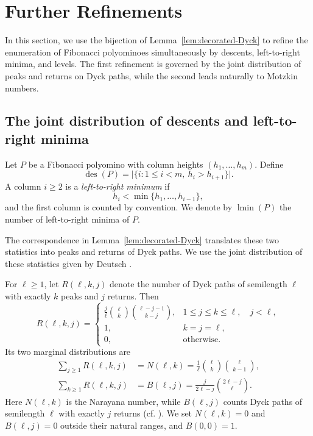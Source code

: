 \documentclass[12pt]{amsart}
\theoremstyle{plain}
\theoremstyle{definition}
\DeclareMathOperator{\des}{des}
\DeclareMathOperator{\lmin}{lmin}
\begin{document}
\section{Further Refinements}\label{sec:further-refinements}


In this section, we use the bijection of
Lemma~\ref{lem:decorated-Dyck} to refine the enumeration of Fibonacci
polyominoes simultaneously by descents, left-to-right minima, and
levels. The first refinement is governed by the joint distribution of
peaks and returns on Dyck paths, while the second leads naturally to
Motzkin numbers.


\subsection{The joint distribution of descents and left-to-right minima}
\label{subsec:descents-minima}


Let $P$ be a Fibonacci polyomino with column heights
$(h_1,\ldots,h_m)$. Define
\[
\des(P)
=
\bigl|\{i:1\leq i<m,\ h_i>h_{i+1}\}\bigr|.
\]
A column $i\geq2$ is a \emph{left-to-right minimum} if
\[
h_i<\min\{h_1,\ldots,h_{i-1}\},
\]
and the first column is counted by convention. We denote by $\lmin(P)$
the number of left-to-right minima of $P$.

The correspondence in Lemma~\ref{lem:decorated-Dyck} translates these
two statistics into peaks and returns of Dyck paths. We use the joint
distribution of these statistics given by Deutsch
\cite[Section~6.5, Eq.~(6.20)]{DeutschDyck}.

For $\ell\geq1$, let $R(\ell,k,j)$ denote the number of Dyck paths of
semilength $\ell$ with exactly $k$ peaks and $j$ returns. Then
\[
R(\ell,k,j)
=
\begin{cases}
\displaystyle
\frac{j}{\ell}
\binom{\ell}{k}
\binom{\ell-j-1}{k-j},
& 1\leq j\leq k\leq\ell,\quad j<\ell,\\[3mm]
1,
& k=j=\ell,\\
0,
& \text{otherwise}.
\end{cases}
\]
Its two marginal distributions are
\begin{align*}
\sum_{j\geq1}R(\ell,k,j)
&=
N(\ell,k)
=
\frac{1}{\ell}
\binom{\ell}{k}
\binom{\ell}{k-1},\\
\sum_{k\geq1}R(\ell,k,j)
&=
B(\ell,j)
=
\frac{j}{2\ell-j}
\binom{2\ell-j}{\ell}.
\end{align*}
Here $N(\ell,k)$ is the Narayana number, while $B(\ell,j)$ counts Dyck
paths of semilength $\ell$ with exactly $j$ returns (cf. \cite{Deutsch98}). We set
$N(\ell,k)=0$ and $B(\ell,j)=0$ outside their natural ranges, and
$B(0,0)=1$.
\end{document}
